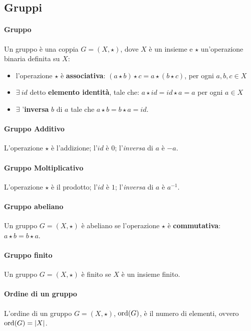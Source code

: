 \subsection{Gruppi}
\paragraph{Gruppo}
    Un gruppo è una coppia $G=(X,\star)$, dove $X$ è un insieme e $\star$ un'operazione binaria definita su $X$:
\begin{itemize}
    \item l'operazione $\star$ è \textbf{associativa}: $(a\star b)\star c=a\star (b \star c)$, per ogni $a,b,c \in X$
    \item $\exists \ id$ detto \textbf{elemento identità}, tale che: $a \star id=id \star a=a$ per ogni $a \in X$
    \item $\exists$ '\textbf{inversa} $b$ di $a$ tale che $a \star b = b\star a= id$.
\end{itemize} 


\paragraph{Gruppo Additivo} L'operazione $\star$ è l'addizione; l'$id$ è $0$; l'\textit{inversa} di $a$ è $-a$.


\paragraph{Gruppo Moltiplicativo}
    L'operazione $\star$ è il prodotto; l'$id$ è $1$; l'\textit{inversa} di $a$ è $a^{-1}$.


\paragraph{Gruppo abeliano}
    Un gruppo $G=(X,\star)$ è abeliano se l'operazione $\star$ è \textbf{commutativa}: $a \star b=b \star a$. 


\paragraph{Gruppo finito}
     Un gruppo $G=(X,\star)$ è finito se $X$ è un insieme finito. 


\paragraph{Ordine di un gruppo}
    L'ordine di un gruppo $G=(X,\star)$, $\operatorname{ord}(G)$, è il numero di elementi, ovvero $\operatorname{ord}(G)=|X|$. 


